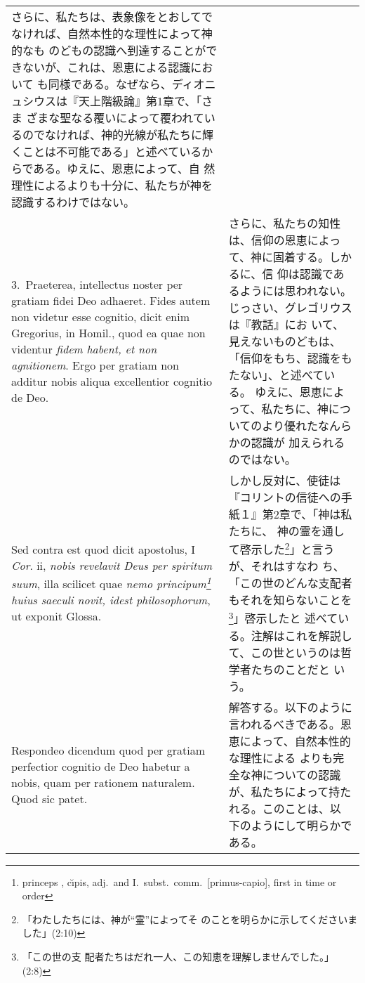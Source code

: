 \documentclass[10pt]{jsarticle} %
\begin{document}
\begin{longtable}{p{21em}p{21em}}
さらに、私たちは、表象像をとおしてでなければ、自然本性的な理性によって神的なも
のどもの認識へ到達することができないが、これは、恩恵による認識において
も同様である。なぜなら、ディオニュシウスは『天上階級論』第1章で、「さま
ざまな聖なる覆いによって覆われているのでなければ、神的光線が私たちに輝
くことは不可能である」と述べているからである。ゆえに、恩恵によって、自
然理性によるよりも十分に、私たちが神を認識するわけではない。

\\

3.~{\sc Praeterea}, intellectus noster per gratiam fidei Deo
adhaeret. Fides autem non videtur esse cognitio, dicit enim Gregorius,
in Homil., quod ea quae non videntur {\it fidem habent, et non
agnitionem}. Ergo per gratiam non additur nobis aliqua excellentior
cognitio de Deo.

&

さらに、私たちの知性は、信仰の恩恵によって、神に固着する。しかるに、信
仰は認識であるようには思われない。じっさい、グレゴリウスは『教話』にお
いて、見えないものどもは、「信仰をもち、認識をもたない」、と述べている。
ゆえに、恩恵によって、私たちに、神についてのより優れたなんらかの認識が
加えられるのではない。

\\

{\sc Sed contra est} quod dicit apostolus, I {\it Cor}. {\sc ii}, {\it
nobis revelavit Deus per spiritum suum}, illa scilicet quae {\it nemo
principum\footnote{princeps , c\u{\i}pis, adj.\ and I.~subst.\ comm.\
[primus-capio], first in time or order} huius saeculi novit, idest
philosophorum}, ut exponit Glossa.

&

しかし反対に、使徒は『コリントの信徒への手紙１』第2章で、「神は私たちに、
神の霊を通して啓示した\footnote{「わたしたちには、神が``霊''によってそ
のことを明らかに示してくださいました」(2:10)}」と言うが、それはすなわ
ち、「この世のどんな支配者もそれを知らないことを\footnote{「この世の支
配者たちはだれ一人、この知恵を理解しませんでした。」(2:8)}」啓示したと
述べている。注解はこれを解説して、この世というのは哲学者たちのことだと
いう。

\\

{\sc Respondeo dicendum} quod per gratiam perfectior cognitio de Deo
habetur a nobis, quam per rationem naturalem. Quod sic patet. 

&

解答する。以下のように言われるべきである。恩恵によって、自然本性的な理性による
よりも完全な神についての認識が、私たちによって持たれる。このことは、以
下のようにして明らかである。


\end{longtable}
\end{document}
